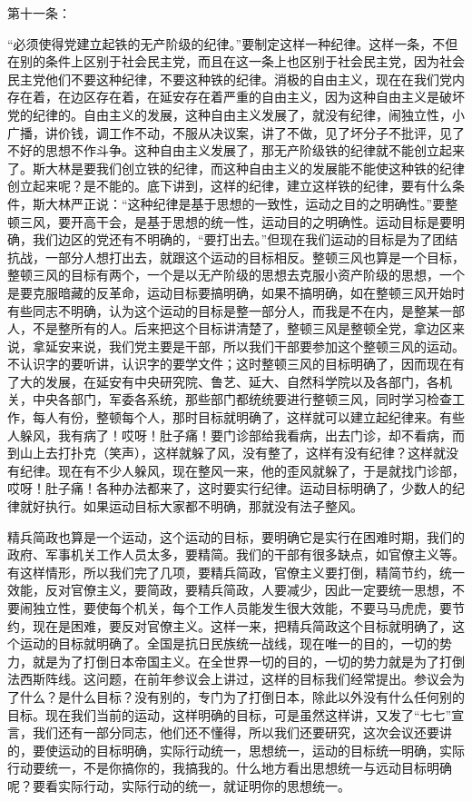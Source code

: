 第十一条：

“必须使得党建立起铁的无产阶级的纪律。”要制定这样一种纪律。这样一条，不但在别的条件上区别于社会民主党，而且在这一条上也区别于社会民主党，因为社会民主党他们不要这种纪律，不要这种铁的纪律。消极的自由主义，现在在我们党内存在着，在边区存在着，在延安存在着严重的自由主义，因为这种自由主义是破坏党的纪律的。自由主义的发展，这种自由主义发展了，就没有纪律，闹独立性，小广播，讲价钱，调工作不动，不服从决议案，讲了不做，见了坏分子不批评，见了不好的思想不作斗争。这种自由主义发展了，那无产阶级铁的纪律就不能创立起来了。斯大林是要我们创立铁的纪律，而这种自由主义的发展能不能使这种铁的纪律创立起来呢？是不能的。底下讲到，这样的纪律，建立这样铁的纪律，要有什么条件，斯大林严正说：“这种纪律是基于思想的一致性，运动之目的之明确性。”要整顿三风，要开高干会，是基于思想的统一性，运动目的之明确性。运动目标是要明确，我们边区的党还有不明确的，“要打出去。”但现在我们运动的目标是为了团结抗战，一部分人想打出去，就跟这个运动的目标相反。整顿三风也算是一个目标，整顿三风的目标有两个，一个是以无产阶级的思想去克服小资产阶级的思想，一个是要克服暗藏的反革命，运动目标要搞明确，如果不搞明确，如在整顿三风开始时有些同志不明确，认为这个运动的目标是整一部分人，而我是不在内，是整某一部人，不是整所有的人。后来把这个目标讲清楚了，整顿三风是整顿全党，拿边区来说，拿延安来说，我们党主要是干部，所以我们干部要参加这个整顿三风的运动。不认识字的要听讲，认识字的要学文件；这时整顿三风的目标明确了，因而现在有了大的发展，在延安有中央研究院、鲁艺、延大、自然科学院以及各部门，各机关，中央各部门，军委各系统，那些部门都统统要进行整顿三风，同时学习检查工作，每人有份，整顿每个人，那时目标就明确了，这样就可以建立起纪律来。有些人躲风，我有病了！哎呀！肚子痛！要门诊部给我看病，出去门诊，却不看病，而到山上去打扑克（笑声），这样就躲了风，没有整了，这样有没有纪律？这样就没有纪律。现在有不少人躲风，现在整风一来，他的歪风就躲了，于是就找门诊部，哎呀！肚子痛！各种办法都来了，这时要实行纪律。运动目标明确了，少数人的纪律就好执行。如果运动目标大家都不明确，那就没有法子整风。

精兵简政也算是一个运动，这个运动的目标，要明确它是实行在困难时期，我们的政府、军事机关工作人员太多，要精简。我们的干部有很多缺点，如官僚主义等。有这样情形，所以我们完了几项，要精兵简政，官僚主义要打倒，精简节约，统一效能，反对官僚主义，要简政，要精兵简政，人要减少，因此一定要统一思想，不要闹独立性，要使每个机关，每个工作人员能发生很大效能，不要马马虎虎，要节约，现在是困难，要反对官僚主义。这样一来，把精兵简政这个目标就明确了，这个运动的目标就明确了。全国是抗日民族统一战线，现在唯一的目的，一切的势力，就是为了打倒日本帝国主义。在全世界一切的目的，一切的势力就是为了打倒法西斯阵线。这问题，在前年参议会上讲过，这样的目标我们经常提出。参议会为了什么？是什么目标？没有别的，专门为了打倒日本，除此以外没有什么任何别的目标。现在我们当前的运动，这样明确的目标，可是虽然这样讲，又发了“七七”宣言，我们还有一部分同志，他们还不懂得，所以我们还要研究，这次会议还要讲的，要使运动的目标明确，实际行动统一，思想统一，运动的目标统一明确，实际行动要统一，不是你搞你的，我搞我的。什么地方看出思想统一与远动目标明确呢？要看实际行动，实际行动的统一，就证明你的思想统一。

